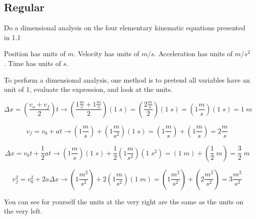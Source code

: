 \hfuzz=100pt 



\subsection*{Regular}

\begin{question}
Do a dimensional analysis on the four elementary kinematic equations presented in 1.1
\end{question}

\begin{solution}
Position has units of $m$. Velocity has units of $m/s$. Acceleration has units of $m/s^2$. Time has units of $s$.

To perform a dimensional analysis, one method is to pretend all variables have an unit of 1, evaluate the expression, and look at the units.

\begin{equation*}
\Delta x = (\frac{v_o + v_f}{2})t \rightarrow 
(\frac{1 \frac{m}{s} + 1 \frac{m}{s}}{2})(1\;s) =
(\frac{2 \frac{m}{s}}{2})(1\;s) = 
(1 \frac{m}{s})(1\;s) = 
1\;m
\end{equation*}

\begin{equation*}
v_f = v_0 + at \rightarrow 
(1\frac{m}{s}) + (1\frac{m}{s^2})(1\;s) =
(1\frac{m}{s}) + (1\frac{m}{s}) =
2\frac{m}{s}
\end{equation*}

\begin{equation*}
\Delta x = v_0t + \frac{1}{2}at \rightarrow 
(1\frac{m}{s})(1\;s) + \frac{1}{2}(1\frac{m}{s^2})(1\;s^2) =
(1\;m) + (\frac{1}{2}\;m) =
\frac{3}{2}\;m
\end{equation*}

\begin{equation*}
v_f^2 = v_0^2 + 2a\Delta x \rightarrow 
(1\frac{m^2}{s^2}) + 2(1\frac{m}{s^2})(1\;m) =
(1\frac{m^2}{s^2}) + (2\frac{m^2}{s^2}) =
3\frac{m^2}{s^2}
\end{equation*}

You can see for yourself the units at the very right are the same as the units on the very left.
\end{solution}

